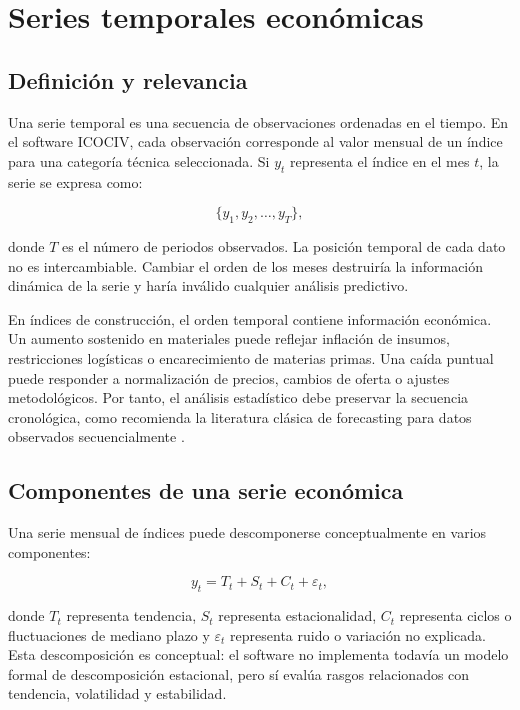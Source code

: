 \section{Series temporales económicas}

\subsection{Definición y relevancia}

Una serie temporal es una secuencia de observaciones ordenadas en el tiempo. En el software ICOCIV, cada observación corresponde al valor mensual de un índice para una categoría técnica seleccionada. Si \(y_t\) representa el índice en el mes \(t\), la serie se expresa como:

\begin{equation}
    \{y_1, y_2, \ldots, y_T\},
    \label{eq:serie_temporal}
\end{equation}

donde \(T\) es el número de periodos observados. La posición temporal de cada dato no es intercambiable. Cambiar el orden de los meses destruiría la información dinámica de la serie y haría inválido cualquier análisis predictivo.

En índices de construcción, el orden temporal contiene información económica. Un aumento sostenido en materiales puede reflejar inflación de insumos, restricciones logísticas o encarecimiento de materias primas. Una caída puntual puede responder a normalización de precios, cambios de oferta o ajustes metodológicos. Por tanto, el análisis estadístico debe preservar la secuencia cronológica, como recomienda la literatura clásica de forecasting para datos observados secuencialmente \parencite{hyndman2021fpp3}.

\subsection{Componentes de una serie económica}

Una serie mensual de índices puede descomponerse conceptualmente en varios componentes:

\begin{equation}
    y_t = T_t + S_t + C_t + \varepsilon_t,
    \label{eq:componentes_serie}
\end{equation}

donde \(T_t\) representa tendencia, \(S_t\) representa estacionalidad, \(C_t\) representa ciclos o fluctuaciones de mediano plazo y \(\varepsilon_t\) representa ruido o variación no explicada. Esta descomposición es conceptual: el software no implementa todavía un modelo formal de descomposición estacional, pero sí evalúa rasgos relacionados con tendencia, volatilidad y estabilidad.

